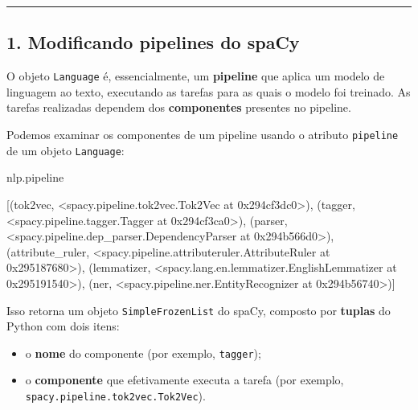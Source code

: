\documentclass[
  brazilian,
  11pt,
]{article}
\newenvironment{Shaded}{\begin{snugshade}}{\end{snugshade}}
\newcommand{\NormalTok}[1]{\textcolor[rgb]{0.81,0.81,0.76}{#1}}
\providecommand{\tightlist}{%
  \setlength{\itemsep}{0pt}\setlength{\parskip}{0pt}}
\let\oldtexttt\texttt
\renewcommand{\texttt}[1]{{\color{inlink}\oldtexttt{#1}}}
\begin{document}
\begin{center}\rule{0.5\linewidth}{0.5pt}\end{center}

\subsection{1. Modificando pipelines do
spaCy}\label{modificando-pipelines-do-spacy}

O objeto \texttt{Language} é, essencialmente, um \textbf{pipeline} que
aplica um modelo de linguagem ao texto, executando as tarefas para as
quais o modelo foi treinado. As tarefas realizadas dependem dos
\textbf{componentes} presentes no pipeline.

Podemos examinar os componentes de um pipeline usando o atributo
\texttt{pipeline} de um objeto \texttt{Language}:

\begin{Shaded}
\begin{Highlighting}[]
\NormalTok{nlp.pipeline}
\end{Highlighting}
\end{Shaded}

\begin{Shaded}
\begin{Highlighting}[]
\NormalTok{[(\textquotesingle{}tok2vec\textquotesingle{}, \textless{}spacy.pipeline.tok2vec.Tok2Vec at 0x294cf3dc0\textgreater{}),}
\NormalTok{ (\textquotesingle{}tagger\textquotesingle{}, \textless{}spacy.pipeline.tagger.Tagger at 0x294cf3ca0\textgreater{}),}
\NormalTok{ (\textquotesingle{}parser\textquotesingle{}, \textless{}spacy.pipeline.dep\_parser.DependencyParser at 0x294b566d0\textgreater{}),}
\NormalTok{ (\textquotesingle{}attribute\_ruler\textquotesingle{}, \textless{}spacy.pipeline.attributeruler.AttributeRuler at 0x295187680\textgreater{}),}
\NormalTok{ (\textquotesingle{}lemmatizer\textquotesingle{}, \textless{}spacy.lang.en.lemmatizer.EnglishLemmatizer at 0x295191540\textgreater{}),}
\NormalTok{ (\textquotesingle{}ner\textquotesingle{}, \textless{}spacy.pipeline.ner.EntityRecognizer at 0x294b56740\textgreater{})]}
\end{Highlighting}
\end{Shaded}

Isso retorna um objeto \texttt{SimpleFrozenList} do spaCy, composto por
\textbf{tuplas} do Python com dois itens:

\begin{itemize}
\tightlist
\item
  o \textbf{nome} do componente (por exemplo, \texttt{tagger});
\item
  o \textbf{componente} que efetivamente executa a tarefa (por exemplo,
  \texttt{spacy.pipeline.tok2vec.Tok2Vec}).
\end{itemize}
\end{document}
